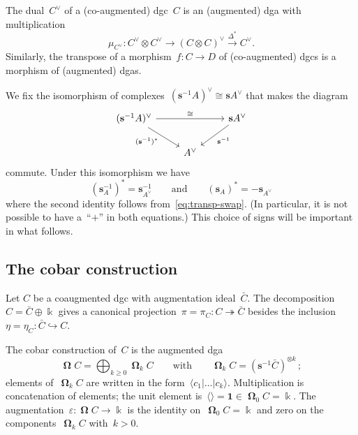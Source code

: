 \documentclass[letterpaper]{amsart}
\numberwithin{equation}{section}
\theoremstyle{plain}
\theoremstyle{definition}
\theoremstyle{remark}
\let\epsilon\varepsilon
\def\kk{\Bbbk}
\def\BBone{\mathbf{1}}
\def\susp{\mathbf{s}}
\def\desusp{\susp^{-1}}
\DeclareMathOperator{\Cobar}{\mathbf{\Omega}}
\def\CobarEl#1{\langle#1\rangle}
\begin{document}
The dual~$C^{\vee}$ of a (co-augmented) dgc~$C$ is an (augmented) dga with multiplication
\begin{equation}
  \mu_{C^{\vee}}\colon C^{\vee}\otimes C^{\vee} \to (C\otimes C)^{\vee} \xrightarrow{\Delta^{*}} C^{\vee}.
\end{equation}
Similarly, the transpose of a morphism~$f\colon C\to D$ of (co-augmented) dgcs is a morphism of (augmented) dgas.

We fix the isomorphism of complexes~$(\desusp A)^{\vee}\cong\susp A^{\vee}$ that makes the diagram
\begin{equation}
  \begin{tikzcd}
    (\desusp A)^{\vee} \arrow{rr}{\cong} \arrow{dr}[below left,pos=0.4]{(\desusp)^{*}} & & \susp A^{\vee} \arrow{dl}{\desusp} \\
    & A^{\vee}
  \end{tikzcd}
\end{equation}
commute. Under this isomorphism we have
\begin{equation}
  \label{eq:transp-susp-desusp}
  (\desusp_{A})^{*} = \desusp_{A^{\vee}}
  \qquad\text{and}\qquad
  (\susp_{A})^{*} = -\susp_{A^{\vee}}
\end{equation}
where the second identity follows from~\eqref{eq:transp-swap}.
(In particular, it is not possible to have a~``$+$'' in both equations.)
This choice of signs will be important in what follows.


\subsection{The cobar construction}
\label{sec:cobar}

Let $C$ be a coaugmented dgc with augmentation ideal~$\bar C$. The decomposition~$C=\bar C\oplus\kk$
gives a canonical projection~$\pi=\pi_{C}\colon C\twoheadrightarrow\bar C$ besides the inclusion~$\eta=\eta_{C}\colon\bar C\hookrightarrow C$.

The cobar construction of~$C$ is the augmented dga
\begin{equation}
  \Cobar C = \bigoplus_{k\ge0} \Cobar_{k}C
  \qquad\text{with}\qquad
  \Cobar_{k}C = (\desusp\bar C)^{\otimes k} \,;
\end{equation}
elements of~$\Cobar_{k}C$ are written in the form~$\CobarEl{c_{1}|\dots|c_{k}}$.
Multiplication is concatenation of elements; the unit element is~$\CobarEl{}=\BBone\in\Cobar_{0}C=\kk$.
The augmentation~$\epsilon\colon\Cobar C\to\kk$ is the identity on~$\Cobar_{0}C=\kk$ and zero
on the components~$\Cobar_{k}C$ with~$k>0$.
\end{document}

